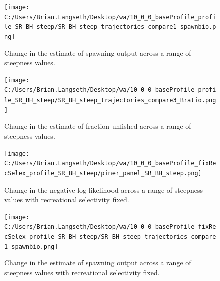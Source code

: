 \documentclass[11pt,
  english,
  a4paper,
]{article}
\begin{document}
\tagmcend\tagstructend


\begin{figure}
\centering
\texttt{[image: C:/Users/Brian.Langseth/Desktop/wa/10\_0\_0\_baseProfile\_profile\_SR\_BH\_steep/SR\_BH\_steep\_trajectories\_compare1\_spawnbio.png]}
\caption{Change in the estimate of spawning output across a range of steepness values.\label{fig:h-ssb}}
\end{figure}

\tagmcend\tagstructend


\begin{figure}
\centering
\texttt{[image: C:/Users/Brian.Langseth/Desktop/wa/10\_0\_0\_baseProfile\_profile\_SR\_BH\_steep/SR\_BH\_steep\_trajectories\_compare3\_Bratio.png]}
\caption{Change in the estimate of fraction unfished across a range of steepness values.\label{fig:h-depl}}
\end{figure}

\tagmcend\tagstructend


\begin{figure}
\centering
\texttt{[image: C:/Users/Brian.Langseth/Desktop/wa/10\_0\_0\_baseProfile\_fixRecSelex\_profile\_SR\_BH\_steep/piner\_panel\_SR\_BH\_steep.png]}
\caption{Change in the negative log-likelihood across a range of steepness values with recreational selectivity fixed.\label{fig:h-recfix-profile}}
\end{figure}

\tagmcend\tagstructend


\begin{figure}
\centering
\texttt{[image: C:/Users/Brian.Langseth/Desktop/wa/10\_0\_0\_baseProfile\_fixRecSelex\_profile\_SR\_BH\_steep/SR\_BH\_steep\_trajectories\_compare1\_spawnbio.png]}
\caption{Change in the estimate of spawning output across a range of steepness values with recreational selectivity fixed.\label{fig:h-recfix-ssb}}
\end{figure}
\end{document}
